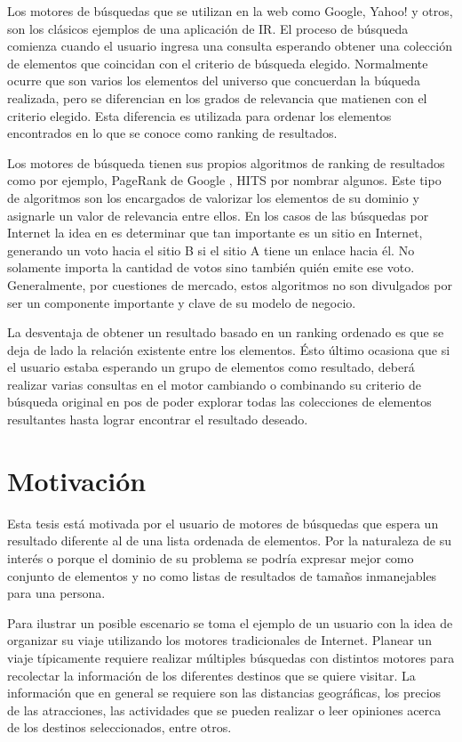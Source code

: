 Los motores de búsquedas que se utilizan en la web como Google, Yahoo! y otros, son los clásicos ejemplos de una aplicación de IR. El proceso de búsqueda comienza cuando el usuario ingresa una consulta esperando obtener una colección de elementos que coincidan con el criterio de búsqueda elegido. Normalmente ocurre que son varios los elementos del universo que concuerdan la búqueda realizada, pero se diferencian en los grados de relevancia que matienen con el criterio elegido. Esta diferencia es utilizada para ordenar los elementos encontrados en lo que se conoce como ranking de resultados.

Los motores de búsqueda tienen sus propios algoritmos de ranking de resultados como por ejemplo, PageRank de Google \cite{Brin:1998:ALH:297810.297827}, HITS \cite{Kleinberg:1999:ASH:324133.324140} por nombrar algunos. Este tipo de algoritmos son los encargados de valorizar los elementos de su dominio y asignarle un valor de relevancia entre ellos. En los casos de las búsquedas por Internet la idea en \cite{Brin:1998:ALH:297810.297827} es determinar que tan importante es un sitio en Internet, generando un voto hacia el sitio B si el sitio A tiene un enlace hacia él. No solamente importa la cantidad de votos sino también quién emite ese voto. Generalmente, por cuestiones de mercado, estos algoritmos no son divulgados por ser un componente importante y clave de su modelo de negocio. 

La desventaja de obtener un resultado basado en un ranking ordenado es que se deja de lado la relación existente entre los elementos. Ésto último ocasiona que si el usuario estaba esperando un grupo de elementos como resultado, deberá realizar varias consultas en el motor cambiando o combinando su criterio de búsqueda original en pos de poder explorar todas las colecciones de elementos resultantes hasta lograr encontrar el resultado deseado.

\section{Motivación}
Esta tesis está motivada por el usuario de motores de búsquedas que espera un resultado diferente al de una lista ordenada de elementos. Por la naturaleza de su interés o porque el dominio de su problema se podría expresar mejor como conjunto de elementos y no como listas de resultados de tamaños inmanejables para una persona.

Para ilustrar un posible escenario se toma el ejemplo de un usuario con la idea de organizar su viaje utilizando los motores tradicionales de Internet. Planear un viaje típicamente requiere realizar múltiples búsquedas con distintos motores para recolectar la información de los diferentes destinos que se quiere visitar. La información que en general se requiere son las distancias geográficas, los precios de las atracciones, las actividades que se pueden realizar o leer opiniones acerca de los destinos seleccionados, entre otros.

